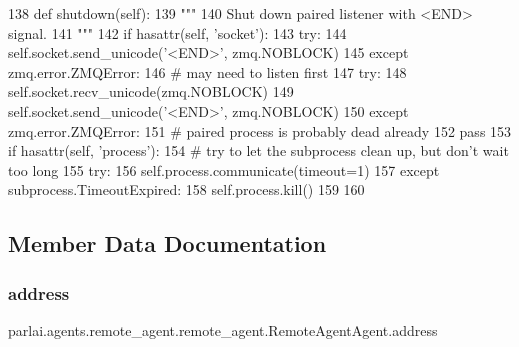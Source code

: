 \begin{DoxyCode}
138     \textcolor{keyword}{def }shutdown(self):
139         \textcolor{stringliteral}{"""}
140 \textcolor{stringliteral}{        Shut down paired listener with <END> signal.}
141 \textcolor{stringliteral}{        """}
142         \textcolor{keywordflow}{if} hasattr(self, \textcolor{stringliteral}{'socket'}):
143             \textcolor{keywordflow}{try}:
144                 self.socket.send\_unicode(\textcolor{stringliteral}{'<END>'}, zmq.NOBLOCK)
145             \textcolor{keywordflow}{except} zmq.error.ZMQError:
146                 \textcolor{comment}{# may need to listen first}
147                 \textcolor{keywordflow}{try}:
148                     self.socket.recv\_unicode(zmq.NOBLOCK)
149                     self.socket.send\_unicode(\textcolor{stringliteral}{'<END>'}, zmq.NOBLOCK)
150                 \textcolor{keywordflow}{except} zmq.error.ZMQError:
151                     \textcolor{comment}{# paired process is probably dead already}
152                     \textcolor{keywordflow}{pass}
153         \textcolor{keywordflow}{if} hasattr(self, \textcolor{stringliteral}{'process'}):
154             \textcolor{comment}{# try to let the subprocess clean up, but don't wait too long}
155             \textcolor{keywordflow}{try}:
156                 self.process.communicate(timeout=1)
157             \textcolor{keywordflow}{except} subprocess.TimeoutExpired:
158                 self.process.kill()
159 
160 
\end{DoxyCode}


\subsection{Member Data Documentation}
\mbox{\label{classparlai_1_1agents_1_1remote__agent_1_1remote__agent_1_1RemoteAgentAgent_a7d776b862be52c47de9abb90337e939f}} 
\subsubsection{\texorpdfstring{address}{address}}
{\footnotesize\ttfamily parlai.\+agents.\+remote\+\_\+agent.\+remote\+\_\+agent.\+Remote\+Agent\+Agent.\+address}



